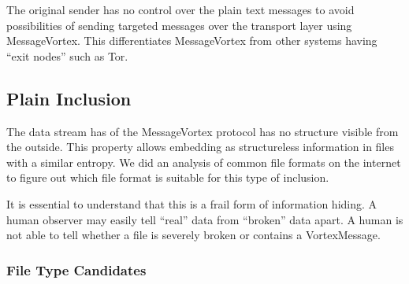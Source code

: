 The original sender has no control over the plain text messages to avoid possibilities of sending targeted messages over the transport layer using MessageVortex. This differentiates MessageVortex from other systems having ``exit nodes'' such as Tor.

\subsection{Plain Inclusion}
The data stream has of the MessageVortex protocol has no structure visible from the outside. This property allows embedding as structureless information in files with a similar entropy. We did an analysis of common file formats on the internet to figure out which file format is suitable for this type of inclusion.

It is essential to understand that this is a frail form of information hiding. A human observer may easily tell ``real'' data from ``broken'' data apart. A human is not able to tell whether a file is severely broken or contains a VortexMessage.

\subsubsection{File Type Candidates}

